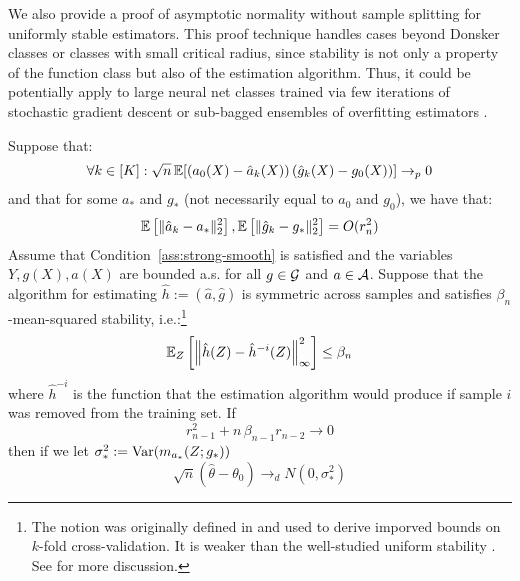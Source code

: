We also provide a proof of asymptotic normality without sample splitting for uniformly stable estimators. This proof technique handles cases beyond Donsker classes or classes with small critical radius, since stability is not only a property of the function class but also of the estimation algorithm. Thus, it could be potentially apply to large neural net classes trained via few iterations of stochastic gradient descent \cite{Hardt2016} or sub-bagged ensembles of overfitting estimators \cite{elisseeff2003leave}.


\begin{lemma}\label{lem:debias-nocross-stability}
Suppose that:
\begin{align}\label{eqn:main-cond-reuse}
    \forall k \in [K]: \sqrt{n}\, \mathbb{E}[(a_0(X) - \hat{a}_k(X))\, (\hat{g}_k(X) - g_0(X))] \rightarrow_p 0
\end{align}
and that for some $a_*$ and $g_*$ (not necessarily equal to $a_0$ and $g_0$), we have that:
\begin{equation}
\mathbb{E}\left[\|\hat{a}_k-a_*\|_2^2\right], \mathbb{E}\left[\|\hat{g}_k-g_*\|_2^2\right] = O(r_n^2)    
\end{equation}
Assume that Condition~\ref{ass:strong-smooth} is satisfied and the variables $Y, g(X), a(X)$ are bounded a.s. for all $g\in {\mathcal G}$ and $a\in {\mathcal A}$. Suppose that the algorithm for estimating $\hat{h}:=(\hat{a}, \hat{g})$ is symmetric across samples and satisfies $\beta_n$-mean-squared stability, i.e.:\footnote{The notion was originally defined in \cite{Kale11cross-validationand} and used to derive imporved bounds on $k$-fold cross-validation. It is weaker than the well-studied uniform stability \cite{Bousquet2002StabilityAG}. See \cite{elisseeff2003leave,Celisse2016,pmlr-v98-abou-moustafa19a} for more discussion.}
\begin{equation}
    \mathbb{E}_Z\left[\left\|\hat{h}(Z) - \hat{h}^{-i}(Z)\right\|_{\infty}^2\right] \leq \beta_n
\end{equation}
where $\hat{h}^{-i}$ is the function that the estimation algorithm would produce if sample $i$ was removed from the training set. If
\begin{equation}
r_{n-1}^2 + n\,\beta_{n-1} r_{n-2}\to 0
\end{equation}
then if we let $\sigma_*^2 := \text{Var}(m_{a_*}(Z; g_*))$
\begin{equation}
    \sqrt{n}\left(\hat{\theta} - \theta_0\right) \to_d N\left(0, \sigma_*^2\right)
\end{equation}
\end{lemma}



